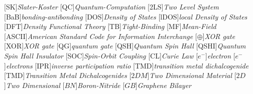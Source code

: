 \begin{acronym}[TDMA]
  [SK]{\emph{Slater-Koster}}
  [QC]{\emph{Quantum-Computation}}
  [2LS]{\emph{Two Level System}}
  [BaB]{\emph{bonding-antibonding}}
  [DOS]{\emph{Density of States}}
  [lDOS]{\emph{local Density of States}}
  [DFT]{\emph{Density Functional Theory}}
  [TB]{\emph{Tight-Binding}}
  [MF]{\emph{Mean-Field}}
  [ASCII]{\emph{American Standard Code for Information Interchange}}
  [$\oplus$]{\emph{XOR gate}}
  [XOR]{\emph{XOR gate}}
  [QG]{\emph{quantum gate}}
  [QSH]{\emph{Quantum Spin Hall}}
  [QSHI]{\emph{Quantum Spin Hall Insulator}}
  [SOC]{\emph{Spin-Orbit Coupling}}
  [CL]{\emph{Curie Law}}
  [$e^{-}$]{\emph{electron}}
  [$e^{-}$]{\emph{electrons}}
  [IPR]{\emph{inverse participation ratio}}
  [TMD]{\emph{transition metal dichalcogenide}}
  [TMD]{\emph{Transition Metal Dichalcogenides}}
  [$2DM$]{\emph{Two Dimensional Material}}
  [$2D$]{\emph{Two Dimensional}}
  [$BN$]{\emph{Boron-Nitride}}
  [$GB$]{\emph{Graphene Bilayer}}
\end{acronym}
